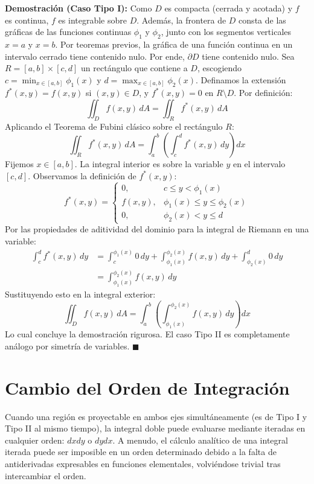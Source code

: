 \documentclass[11pt,a4paper]{article}
\begin{document}
\textbf{Demostración (Caso Tipo I):}
Como $D$ es compacta (cerrada y acotada) y $f$ es continua, $f$ es integrable sobre $D$. Además, la frontera de $D$ consta de las gráficas de las funciones continuas $\phi_1$ y $\phi_2$, junto con los segmentos verticales $x=a$ y $x=b$. Por teoremas previos, la gráfica de una función continua en un intervalo cerrado tiene contenido nulo. Por ende, $\partial D$ tiene contenido nulo.
Sea $R = [a,b] \times [c,d]$ un rectángulo que contiene a $D$, escogiendo $c = \min_{x \in [a,b]} \phi_1(x)$ y $d = \max_{x \in [a,b]} \phi_2(x)$.
Definamos la extensión $f^*(x,y) = f(x,y)$ si $(x,y) \in D$, y $f^*(x,y) = 0$ en $R \setminus D$.
Por definición:
\[
\iint_D f(x,y) \, dA = \iint_R f^*(x,y) \, dA
\]
Aplicando el Teorema de Fubini clásico sobre el rectángulo $R$:
\[
\iint_R f^*(x,y) \, dA = \int_a^b \left( \int_c^d f^*(x,y) \, dy \right) dx
\]
Fijemos $x \in [a,b]$. La integral interior es sobre la variable $y$ en el intervalo $[c,d]$. Observamos la definición de $f^*(x,y)$:
\[
f^*(x,y) = \begin{cases} 
0, & c \leq y < \phi_1(x) \\
f(x,y), & \phi_1(x) \leq y \leq \phi_2(x) \\
0, & \phi_2(x) < y \leq d 
\end{cases}
\]
Por las propiedades de aditividad del dominio para la integral de Riemann en una variable:
\begin{align*}
\int_c^d f^*(x,y) \, dy &= \int_c^{\phi_1(x)} 0 \, dy + \int_{\phi_1(x)}^{\phi_2(x)} f(x,y) \, dy + \int_{\phi_2(x)}^d 0 \, dy \\
&= \int_{\phi_1(x)}^{\phi_2(x)} f(x,y) \, dy
\end{align*}
Sustituyendo esto en la integral exterior:
\[
\iint_D f(x,y) \, dA = \int_a^b \left( \int_{\phi_1(x)}^{\phi_2(x)} f(x,y) \, dy \right) dx
\]
Lo cual concluye la demostración rigurosa. El caso Tipo II es completamente análogo por simetría de variables. $\blacksquare$

\section{Cambio del Orden de Integración}

Cuando una región es proyectable en ambos ejes simultáneamente (es de Tipo I y Tipo II al mismo tiempo), la integral doble puede evaluarse mediante iteradas en cualquier orden: $dx dy$ o $dy dx$. A menudo, el cálculo analítico de una integral iterada puede ser imposible en un orden determinado debido a la falta de antiderivadas expresables en funciones elementales, volviéndose trivial tras intercambiar el orden.
\end{document}
